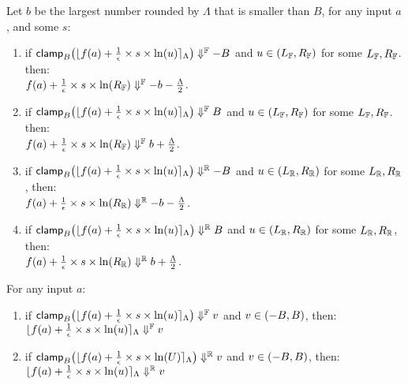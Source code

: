 \documentclass[a4paper,11pt]{article}
\begin{document}
\begin{lem}[clampR]
\label{lem:clampr}
Let $b$ be the largest number rounded by $\Lambda$ that is smaller than $B$, for any input $a$, and some $s$:
\begin{enumerate}
\item 
if 
$\mathsf{clamp}_B \big(
	\lfloor f(a) + \frac{1}{\epsilon} \times s \times \ln (u) \rceil_{\Lambda}
	\big)
	\Downarrow^{\mathbb{F}} -B$ and $u \in (L_{\mathbb{F}}, R_{\mathbb{F}})$ for some $L_{\mathbb{F}}, R_{\mathbb{F}}$.
	 then:
	 \\
	$f(a) + \frac{1}{\epsilon} \times s \times \ln (R_{\mathbb{F}}) \Downarrow^{\mathbb{F}} -b - \frac{\Lambda}{2}$.
%
\item 
if 
$\mathsf{clamp}_B \big(
	\lfloor f(a) + \frac{1}{\epsilon} \times s \times \ln (u) \rceil_{\Lambda}
	\big)
	\Downarrow^{\mathbb{F}} B$ and $u \in (L_{\mathbb{F}}, R_{\mathbb{F}})$ for some $L_{\mathbb{F}}, R_{\mathbb{F}}$.
	 then:
	 \\
	$f(a) + \frac{1}{\epsilon} \times s \times \ln (R_{\mathbb{F}}) \Downarrow^{\mathbb{F}} b + \frac{\Lambda}{2}$.
%
\item
if
$\mathsf{clamp}_B \big(
	\lfloor f(a) + \frac{1}{\epsilon} \times s \times \ln (u) \rceil_{\Lambda}
	\big)
	\Downarrow^{\mathbb{R}} -B$ and $u \in (L_{\mathbb{R}}, R_{\mathbb{R}})$ for some $L_{\mathbb{R}}, R_{\mathbb{R}}$, then:
	 \\
	$f(a) + \frac{1}{\epsilon} \times s \times \ln (R_{\mathbb{R}}) \Downarrow^{\mathbb{R}} -b - \frac{\Lambda}{2}$.
%
\item
if
$\mathsf{clamp}_B \big(
	\lfloor f(a) + \frac{1}{\epsilon} \times s \times \ln (u) \rceil_{\Lambda}
	\big)
	\Downarrow^{\mathbb{R}} B$ and $u \in (L_{\mathbb{R}}, R_{\mathbb{R}})$ for some $L_{\mathbb{R}}, R_{\mathbb{R}}$, then:
	 \\
	$f(a) + \frac{1}{\epsilon} \times s \times \ln (R_{\mathbb{R}}) \Downarrow^{\mathbb{R}} b + \frac{\Lambda}{2}$.
%
\end{enumerate}
\end{lem}


\begin{lem}[clampId]
\label{lem:clampid}
For any input $a$:
\begin{enumerate}
\item 
if 
$\mathsf{clamp}_B \big(
	\lfloor f(a) + \frac{1}{\epsilon} \times s \times \ln (u) \rceil_{\Lambda}
	\big)
	\Downarrow^{\mathbb{F}} v$ and $v \in (-B, B)$, then:
	$\lfloor f(a) + \frac{1}{\epsilon} \times s \times \ln (u) \rceil_{\Lambda}
	\Downarrow^{\mathbb{F}} v$
%
\item
if
$\mathsf{clamp}_B \big(
	\lfloor f(a) + \frac{1}{\epsilon} \times s \times \ln (U) \rceil_{\Lambda}
	\big)
	\Downarrow^{\mathbb{R}} v$ and $v \in (-B, B)$, then:
	$\lfloor f(a) + \frac{1}{\epsilon} \times s \times \ln (u) \rceil_{\Lambda}
	\Downarrow^{\mathbb{R}} v$
\end{enumerate}
\end{lem}
\end{document}
